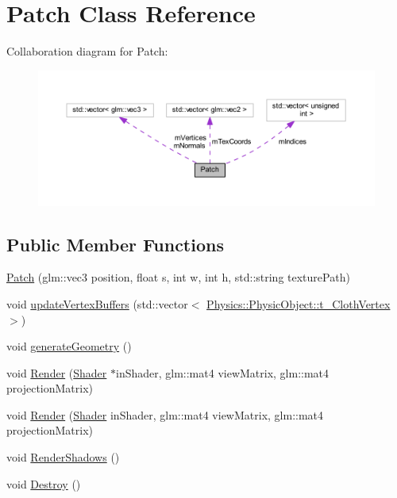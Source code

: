 \hypertarget{class_patch}{}\section{Patch Class Reference}
\label{class_patch}


Collaboration diagram for Patch\+:
\nopagebreak
\begin{figure}[H]
\begin{center}
\leavevmode
\includegraphics[width=350pt]{class_patch__coll__graph}
\end{center}
\end{figure}
\subsection*{Public Member Functions}
\begin{DoxyCompactItemize}
\item 
\hyperlink{class_patch_a325e0e4b125bf7b121a92b819a1829b6}{Patch} (glm\+::vec3 position, float s, int w, int h, std\+::string texture\+Path)
\item 
void \hyperlink{class_patch_a9be709377da88bbdb41d3be5bd0d1304}{update\+Vertex\+Buffers} (std\+::vector$<$ \hyperlink{struct_physics_1_1_physic_object_1_1t___cloth_vertex}{Physics\+::\+Physic\+Object\+::t\+\_\+\+Cloth\+Vertex} $>$)
\item 
void \hyperlink{class_patch_a15da6bd801bd94e154840be9fafa0144}{generate\+Geometry} ()
\item 
void \hyperlink{class_patch_acf061ad5c711edadf53041dada53aeac}{Render} (\hyperlink{class_shader}{Shader} $\ast$in\+Shader, glm\+::mat4 view\+Matrix, glm\+::mat4 projection\+Matrix)
\item 
void \hyperlink{class_patch_a54b25c84906b56239801329a86a62b61}{Render} (\hyperlink{class_shader}{Shader} in\+Shader, glm\+::mat4 view\+Matrix, glm\+::mat4 projection\+Matrix)
\item 
void \hyperlink{class_patch_aa1bad94df8b360742dd6792919d0d10c}{Render\+Shadows} ()
\item 
void \hyperlink{class_patch_ac92e88795e488d68f3d48c7f8c88b07f}{Destroy} ()
\end{DoxyCompactItemize}
